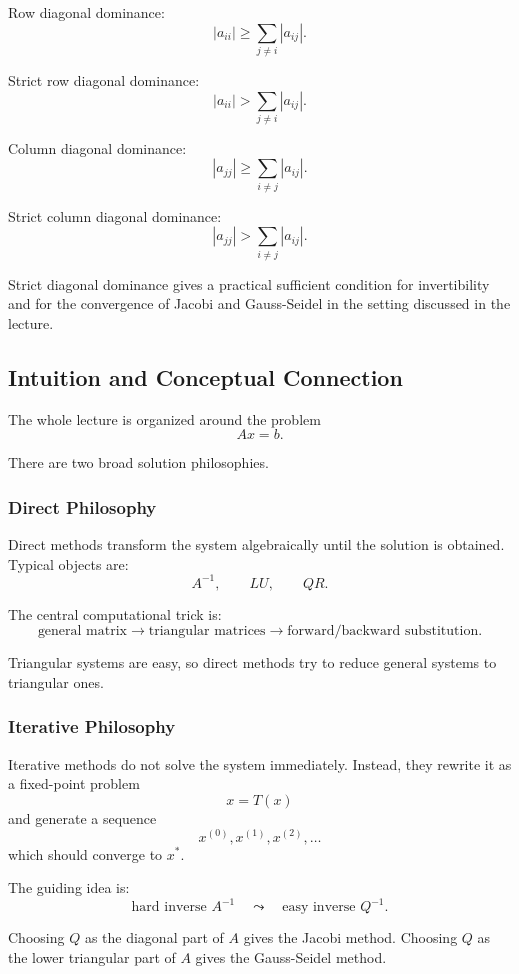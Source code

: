 \documentclass[10pt, letterpaper]{article}
\begin{document}
Row diagonal dominance:
\[
|a_{ii}|
\geq
\sum_{j\neq i}|a_{ij}|.
\]

Strict row diagonal dominance:
\[
|a_{ii}|
>
\sum_{j\neq i}|a_{ij}|.
\]

Column diagonal dominance:
\[
|a_{jj}|
\geq
\sum_{i\neq j}|a_{ij}|.
\]

Strict column diagonal dominance:
\[
|a_{jj}|
>
\sum_{i\neq j}|a_{ij}|.
\]

Strict diagonal dominance gives a practical sufficient condition for invertibility and for the convergence of Jacobi and Gauss-Seidel in the setting discussed in the lecture.

\subsection{Intuition and Conceptual Connection}

The whole lecture is organized around the problem
\[
Ax=b.
\]

There are two broad solution philosophies.

\subsubsection{Direct Philosophy}

Direct methods transform the system algebraically until the solution is obtained. Typical objects are:
\[
A^{-1},
\qquad
LU,
\qquad
QR.
\]

The central computational trick is:
\[
\text{general matrix}
\longrightarrow
\text{triangular matrices}
\longrightarrow
\text{forward/backward substitution}.
\]

Triangular systems are easy, so direct methods try to reduce general systems to triangular ones.

\subsubsection{Iterative Philosophy}

Iterative methods do not solve the system immediately. Instead, they rewrite it as a fixed-point problem
\[
x=T(x)
\]
and generate a sequence
\[
x^{(0)},x^{(1)},x^{(2)},\dots
\]
which should converge to \(x^\ast\).

The guiding idea is:
\[
\text{hard inverse } A^{-1}
\quad\leadsto\quad
\text{easy inverse } Q^{-1}.
\]

Choosing \(Q\) as the diagonal part of \(A\) gives the Jacobi method. Choosing \(Q\) as the lower triangular part of \(A\) gives the Gauss-Seidel method.
\end{document}
